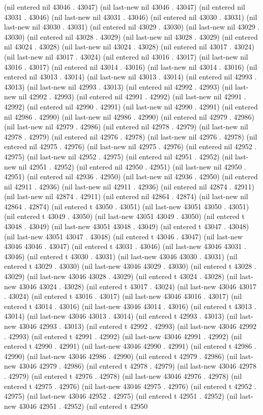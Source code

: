 (nil entered nil 43046 . 43047) (nil last-new nil 43046 . 43047) (nil entered nil 43031 . 43046) (nil last-new nil 43031 . 43046) (nil entered nil 43030 . 43031) (nil last-new nil 43030 . 43031) (nil entered nil 43029 . 43030) (nil last-new nil 43029 . 43030) (nil entered nil 43028 . 43029) (nil last-new nil 43028 . 43029) (nil entered nil 43024 . 43028) (nil last-new nil 43024 . 43028) (nil entered nil 43017 . 43024) (nil last-new nil 43017 . 43024) (nil entered nil 43016 . 43017) (nil last-new nil 43016 . 43017) (nil entered nil 43014 . 43016) (nil last-new nil 43014 . 43016) (nil entered nil 43013 . 43014) (nil last-new nil 43013 . 43014) (nil entered nil 42993 . 43013) (nil last-new nil 42993 . 43013) (nil entered nil 42992 . 42993) (nil last-new nil 42992 . 42993) (nil entered nil 42991 . 42992) (nil last-new nil 42991 . 42992) (nil entered nil 42990 . 42991) (nil last-new nil 42990 . 42991) (nil entered nil 42986 . 42990) (nil last-new nil 42986 . 42990) (nil entered nil 42979 . 42986) (nil last-new nil 42979 . 42986) (nil entered nil 42978 . 42979) (nil last-new nil 42978 . 42979) (nil entered nil 42976 . 42978) (nil last-new nil 42976 . 42978) (nil entered nil 42975 . 42976) (nil last-new nil 42975 . 42976) (nil entered nil 42952 . 42975) (nil last-new nil 42952 . 42975) (nil entered nil 42951 . 42952) (nil last-new nil 42951 . 42952) (nil entered nil 42950 . 42951) (nil last-new nil 42950 . 42951) (nil entered nil 42936 . 42950) (nil last-new nil 42936 . 42950) (nil entered nil 42911 . 42936) (nil last-new nil 42911 . 42936) (nil entered nil 42874 . 42911) (nil last-new nil 42874 . 42911) (nil entered nil 42864 . 42874) (nil last-new nil 42864 . 42874) (nil entered t 43050 . 43051) (nil last-new 43051 43050 . 43051) (nil entered t 43049 . 43050) (nil last-new 43051 43049 . 43050) (nil entered t 43048 . 43049) (nil last-new 43051 43048 . 43049) (nil entered t 43047 . 43048) (nil last-new 43051 43047 . 43048) (nil entered t 43046 . 43047) (nil last-new 43046 43046 . 43047) (nil entered t 43031 . 43046) (nil last-new 43046 43031 . 43046) (nil entered t 43030 . 43031) (nil last-new 43046 43030 . 43031) (nil entered t 43029 . 43030) (nil last-new 43046 43029 . 43030) (nil entered t 43028 . 43029) (nil last-new 43046 43028 . 43029) (nil entered t 43024 . 43028) (nil last-new 43046 43024 . 43028) (nil entered t 43017 . 43024) (nil last-new 43046 43017 . 43024) (nil entered t 43016 . 43017) (nil last-new 43046 43016 . 43017) (nil entered t 43014 . 43016) (nil last-new 43046 43014 . 43016) (nil entered t 43013 . 43014) (nil last-new 43046 43013 . 43014) (nil entered t 42993 . 43013) (nil last-new 43046 42993 . 43013) (nil entered t 42992 . 42993) (nil last-new 43046 42992 . 42993) (nil entered t 42991 . 42992) (nil last-new 43046 42991 . 42992) (nil entered t 42990 . 42991) (nil last-new 43046 42990 . 42991) (nil entered t 42986 . 42990) (nil last-new 43046 42986 . 42990) (nil entered t 42979 . 42986) (nil last-new 43046 42979 . 42986) (nil entered t 42978 . 42979) (nil last-new 43046 42978 . 42979) (nil entered t 42976 . 42978) (nil last-new 43046 42976 . 42978) (nil entered t 42975 . 42976) (nil last-new 43046 42975 . 42976) (nil entered t 42952 . 42975) (nil last-new 43046 42952 . 42975) (nil entered t 42951 . 42952) (nil last-new 43046 42951 . 42952) (nil entered t 42950 